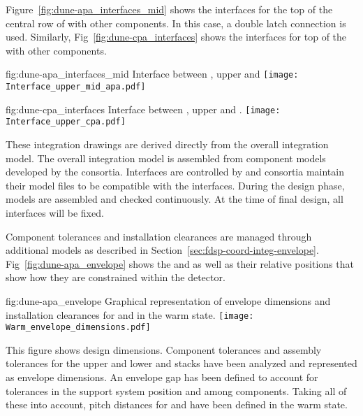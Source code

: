 Figure~\ref{fig:dune-apa_interfaces_mid} shows the interfaces for the
top of the central row of  with other components. In this case, a
double latch connection is used. Similarly,
Fig~\ref{fig:dune-cpa_interfaces} shows the interfaces for top of the
 with other components.
\begin{dunefigure}{fig:dune-apa_interfaces_mid}
  {Interface between , upper  and }
  \texttt{[image: Interface\_upper\_mid\_apa.pdf]}
\end{dunefigure}
\begin{dunefigure}
    {fig:dune-cpa_interfaces}
  {Interface between , upper  and .}
  \texttt{[image: Interface\_upper\_cpa.pdf]}
\end{dunefigure}

These integration drawings are derived directly from the overall
integration model. The overall integration model is assembled from
component models developed by the consortia. Interfaces are controlled
by  and consortia maintain their model files to be
compatible with the interfaces. During the design phase, models are
assembled and checked continuously. At the time of final design, all
interfaces will be fixed.


Component tolerances and installation clearances are managed through
additional models as described in
Section~\ref{sec:fdsp-coord-integ-envelope}.
Fig~\ref{fig:dune-apa_envelope} shows the  and
 as well as their relative positions that show how they are
constrained within the detector.
\begin{dunefigure}{fig:dune-apa_envelope} {Graphical
    representation of envelope dimensions and installation clearances
    for  and  in the warm state.}
  \texttt{[image: Warm\_envelope\_dimensions.pdf]}
\end{dunefigure}


This figure shows design dimensions. Component tolerances and assembly
tolerances for the upper and lower  and  stacks
have been analyzed and represented as envelope dimensions. An envelope
gap has been defined to account for tolerances in the support system
position and among components. Taking all of these into account, pitch
distances for  and  have been defined in the
warm state.

